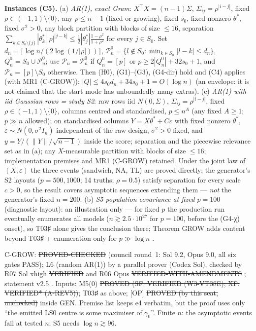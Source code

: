 \textbf{Instances (C5).} (a) \emph{AR(1), exact Gram}: $X^\top X=(n-1)\Sigma$, $\Sigma_{ij}=\rho^{|i-j|}$, fixed $\rho\in(-1,1)\setminus\{0\}$, any $p\le n-1$ (fixed or growing), fixed $s_0$, fixed nonzero $\theta^*$, fixed $\sigma^2>0$, any block partition with blocks of size $\le16$, separation $\sum_{k\in S_0\setminus\{j\}}|\theta^*_k||\rho|^{|j-k|}\le\frac12|\theta^*_j|\frac{1-\rho^2}{1+\rho^2}$ for every $j\in S_0$. Set $d_n=\lceil\log n/(2\log(1/|\rho|))\rceil$, $\mathcal P_n^0=\{l\notin S_0:\min_{k\in S_0}|l-k|\le d_n\}$, $Q_n^0=S_0\cup\mathcal P_n^0$; use $\mathcal P_n=\mathcal P_n^0$ if $Q_n^0=[p]$ or $p\ge2|Q_n^0|+32s_0+1$, and $\mathcal P_n=[p]\setminus S_0$ otherwise. Then (H0), (G1)--(G3), (G4-dir) hold and (C4) applies (with MR1 (C-GROW)); $|Q|\le4s_0d_n+34s_0+1=O(\log n)$ (an envelope: it is not claimed that the start mode has unboundedly many extras). (c) \emph{AR(1) with iid Gaussian rows = study S2}: raw rows iid $N(0,\Sigma)$, $\Sigma_{ij}=\rho^{|i-j|}$, fixed $\rho\in(-1,1)\setminus\{0\}$, columns centred and standardised, $p\le n^A$ (any fixed $A\ge1$; $p\gg n$ allowed); on standardised columns $Y=X\theta^*+C\varepsilon$ with fixed nonzero $\theta^*$, $\varepsilon\sim N(0,\sigma^2I_n)$ independent of the raw design, $\sigma^2>0$ fixed, and $y=Y/(\|Y\|/\sqrt{n-1})$ inside the score; separation and the piecewise relevance set as in (a); any $X$-measurable partition with blocks of size $\le16$; implementation premises and MR1 (C-GROW) retained. Under the joint law of $(X,\varepsilon)$ the three events (sandwich, NA, TL) are proved directly; the generator's S2 layouts ($p=500,1000$; 14 truths; $\rho=0.5$) satisfy separation for every scale $c>0$, so the result covers asymptotic sequences extending them — \emph{not} the generator's fixed $n=200$. (b) \emph{S5 population covariance at fixed $p=100$} (diagnostic layout): an illustration only — for fixed $p$ the production run eventually enumerates all models ($n\gtrsim2.5\cdot10^{27}$ for $p=100$, before the (G4-χ) onset), so T03♯ alone gives the conclusion there; Theorem GROW adds content beyond T03♯ + enumeration only for $p\gg\log n$ .
\begin{statusbox}
C-GROW: \st{PROVED-CHECKED} (council round~1: Sol 9.2, Opus 9.0, all six gates PASS); L6 (random AR(1)) by a parallel prover (Codex Sol), checked by R07 Sol xhigh \st{VERIFIED} and R06 Opus \st{VERIFIED-WITH-AMENDMENTS} ; statement v2.5 . Inputs: M5(0) \st{PROVED (SF: VERIFIED (W3-VT38E); XF: VERIFIED* (A-REV5))}; T03♯ as above; [OP] \st{PROVED (by this seat, unchecked)} inside GEN. Premise list keeps e4 verbatim, but the proof uses only ``the emitted LS0 centre is some maximiser of $\gamma_0$''. Finite $n$: the asymptotic events fail at tested $n$; S5 needs $\log n\gtrsim96$.
\end{statusbox}

